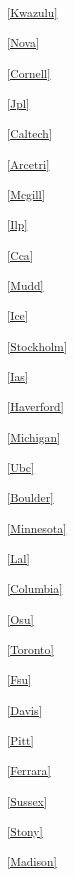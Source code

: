\begin{multicols}{2}
\noindent
\textsuperscript{\ref{Kwazulu}}\Kwazulutext

\noindent
\textsuperscript{\ref{Nova}}\Novatext

\noindent
\textsuperscript{\ref{Cornell}}\Cornelltext

\noindent
\textsuperscript{\ref{Jpl}}\Jpltext

\noindent
\textsuperscript{\ref{Caltech}}\Caltechtext

\noindent
\textsuperscript{\ref{Arcetri}}\Arcetritext

\noindent
\textsuperscript{\ref{Mcgill}}\Mcgilltext

\noindent
\textsuperscript{\ref{Ilp}}\Ilptext

\noindent
\textsuperscript{\ref{Cca}}\Ccatext

\noindent
\textsuperscript{\ref{Mudd}}\Muddtext

\noindent
\textsuperscript{\ref{Ice}}\Icetext

\noindent
\textsuperscript{\ref{Stockholm}}\Stockholmtext

\noindent
\textsuperscript{\ref{Ias}}\Iastext

\noindent
\textsuperscript{\ref{Haverford}}\Haverfordtext

\noindent
\textsuperscript{\ref{Michigan}}\Michigantext

\noindent
\textsuperscript{\ref{Ubc}}\Ubctext

\noindent
\textsuperscript{\ref{Boulder}}\Bouldertext

\noindent
\textsuperscript{\ref{Minnesota}}\Minnesotatext

\noindent
\textsuperscript{\ref{Lal}}\Laltext

\noindent
\textsuperscript{\ref{Columbia}}\Columbiatext

\noindent
\textsuperscript{\ref{Osu}}\Osutext

\noindent
\textsuperscript{\ref{Toronto}}\Torontotext

\noindent
\textsuperscript{\ref{Fsu}}\Fsutext

\noindent
\textsuperscript{\ref{Davis}}\Davistext

\noindent
\textsuperscript{\ref{Pitt}}\Pitttext

\noindent
\textsuperscript{\ref{Ferrara}}\Ferraratext

\noindent
\textsuperscript{\ref{Sussex}}\Sussextext

\noindent
\textsuperscript{\ref{Stony}}\Stonytext

\noindent
\textsuperscript{\ref{Madison}}\Madisontext


\end{multicols}
